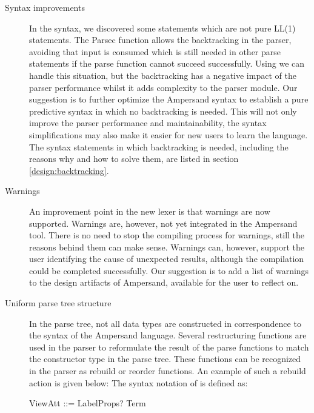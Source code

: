 \begin{description}
  \item[Syntax improvements]
    In the syntax, we discovered some statements which are not pure LL(1) statements.
    The Parsec  function allows the backtracking in the parser, avoiding that input is consumed which is still needed in other parse statements if the parse function cannot succeed successfully.
    Using  we can handle this situation, but the backtracking has a negative impact of the parser performance whilst it adds complexity to the parser module.
    Our suggestion is to further optimize the Ampersand syntax to establish a pure predictive syntax in which no backtracking is needed.
    This will not only improve the parser performance and maintainability, the syntax simplifications may also make it easier for new users to learn the language.
    The syntax statements in which backtracking is needed, including the reasons why and how to solve them, are listed in section \ref{design:backtracking}.

  \item[Warnings]
    An improvement point in the new lexer is that warnings are now supported. 
    Warnings are, however, not yet integrated in the Ampersand tool.
    There is no need to stop the compiling process for warnings, still the reasons behind them can make sense.
    Warnings can, however, support the user identifying the cause of unexpected results, although the compilation could be completed successfully.
    Our suggestion is to add a list of warnings to the design artifacts of Ampersand, available for the user to reflect on.

  \item[Uniform parse tree structure]
   In the parse tree, not all data types are constructed in correspondence to the syntax of the Ampersand language.
   Several restructuring functions are used in the parser to reformulate the result of the parse functions to match the constructor type in the parse tree.
   These functions can be recognized in the parser as rebuild or reorder functions.
   An example of such a rebuild action is given below:
   The syntax notation of  is defined as:
   \begin{ebnf}
    ViewAtt ::= LabelProps? Term\end{ebnf}
   

\end{description}
